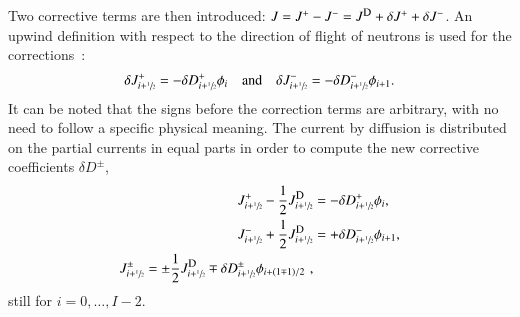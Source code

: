 Two corrective terms are then introduced: $J = \jp - \jm = \jD + \delta J^+ + \delta J^-$. An upwind definition with respect to the direction of flight of neutrons is used for the corrections~\cite{Jarrett-2016,Zhu-2016}:
\begin{equation}
  \label{eq:CCF-sub}
  \delta J^+ _{i+\sfrac{1}{2}} = -\delta D^+ _{i+\sfrac{1}{2}} \phi_i
  \quad \text{and} \quad
  \delta J^- _{i+\sfrac{1}{2}} = -\delta D^- _{i+\sfrac{1}{2}} \phi_{i+1}.
\end{equation}
It can be noted that the signs before the correction terms are arbitrary, with no need to follow a specific physical meaning. 
%
%
The current by diffusion is distributed on the partial currents in equal parts in order to compute the new corrective coefficients $\delta D^{\pm}$,
\begin{subequations}
  \label{eq:delta-D-pCMFD}
  \begin{align}
    J^+_{i+\hzi} - \frac{1}{2}\jD_{i+\hzi} &= -\delta D^+_{i+\hzi} \phi_i, \label{eq:delta-D-pCMFDp}\\
    J^-_{i+\hzi} + \frac{1}{2}\jD_{i+\hzi} &= +\delta D^-_{i+\hzi} \phi_{i+1}, \label{eq:delta-D-pCMFDm} \\
    J^\pm_{i+\hzi} = \pm \frac{1}{2}\jD_{i+\hzi} \mp \delta D^{\pm} _{i+\hzi} \phi_{i+(1\mp 1)/2}\label{eq:delta-D-pCMFDpm} \,\,,
  \end{align}
\end{subequations}
still for $i=0, \ldots, I-2$.
%
%

